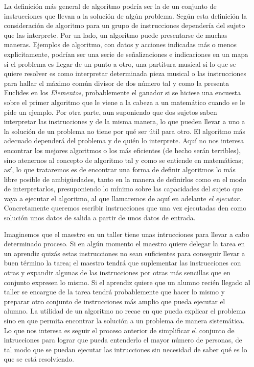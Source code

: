 

La definición más general de algoritmo podría ser la de un conjunto de instrucciones que llevan a la
solución de algún problema. Según esta definición la consideración de algoritmo para un grupo de
instrucciones dependería del sujeto que las interprete. Por un lado, un algoritmo puede presentarse
de muchas maneras. Ejemplos de algoritmo, con datos y acciones indicadas más o menos explicitamente,
podrían ser una serie de señalizaciones e indicaciones en un mapa si el problema es llegar de un
punto a otro, una partitura musical si lo que se quiere resolver es como interpretar determinada
pieza musical o las instrucciones para hallar el máximo común divisor de dos número tal y como la
presenta Euclides en los {\it Elementos}, probablemente el ganador si se hiciese una encuesta sobre
el primer algoritmo que le viene a la cabeza a un matemático cuando se le pide un ejemplo. Por otra
parte, aun suponiendo que dos sujetos saben interpretar las instrucciones y de la misma manera, lo
que pueden llevar a uno a la solución de un problema no tiene por qué ser útil para otro. El
algoritmo más adecuado dependerá del problema y de quién lo interprete.  Aquí no nos interesa
encontrar los mejores algoritmos o los más eficientes (de hecho serán terribles), sino atenernos al
concepto de algoritmo tal y como se entiende en matemáticas; así, lo que trataremos es de encontrar
una forma de definir algoritmos lo más libre posible de ambigüedades, tanto en la manera de
definirlos como en el modo de interpretarlos, presuponiendo lo mínimo sobre las capacidades del
sujeto que vaya a ejecutar el algoritmo, al que llamaremos de aquí en adelante {\it el
ejecutor}. Concretamente queremos escribir instrucciones que una vez ejecutadas den como
solución unos datos de salida a partir de unos datos de entrada.

Imaginemos que el maestro en un taller tiene unas intrucciones para llevar a cabo determinado
proceso. Si en algún momento el maestro quiere delegar la tarea en un aprendiz quizás estas
instrucciones no sean suficientes para conseguir llevar a buen término la tarea; el maestro tendrá
que suplementar las instrucciones con otras y expandir algunas de las instrucciones por otras más
sencillas que en conjunto expresen lo mismo. Si el aprendiz quiere que un alumno recién llegado al
taller se encargue de la tarea tendrá probablemente que hacer lo mismo y preparar otro conjunto de
instrucciones más amplio que pueda ejecutar el alumno. La utilidad de un algoritmo no recae en que
pueda explicar el problema sino en que permita encontrar la solución a un problema de manera
sistemática. Lo que nos interesa es seguir el proceso anterior de simplificar el conjunto de
intrucciones para lograr que pueda entenderlo el mayor número de personas, de tal modo que se puedan
ejecutar las intrucciones sin necesidad de saber qué es lo que se está resolviendo.

